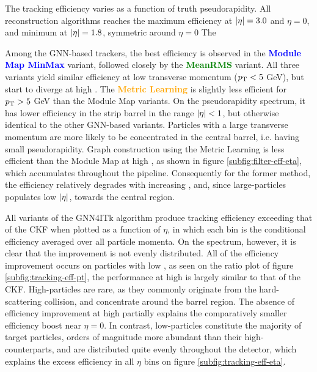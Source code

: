 The tracking efficiency varies as a function of truth pseudorapidity.
All reconstruction algorithms reaches the maximum efficiency at $\abs{\eta}=3.0$ and $\eta=0$, and minimum at $\abs{\eta}=1.8$, symmetric around $\eta=0$
The 

Among the GNN-based trackers, the best efficiency is observed in the \textcolor{blue}{\textbf{Module Map MinMax}} variant, followed closely by the \textcolor{green}{\textbf{MeanRMS}} variant.
All three variants yield similar efficiency at low transverse momentum ($p_{\text{T}}<5$ GeV), but start to diverge at high \pT.
The \textcolor{orange}{\textbf{Metric Learning}} is slightly less efficient for $p_{\text{T}} > 5$ GeV than the Module Map variants.
On the pseudorapidity spectrum, it has lower efficiency in the strip barrel in the range $\abs{\eta}<1$, but otherwise identical to the other GNN-based variants.
Particles with a large transverse momentum are more likely to be concentrated in the central barrel, i.e. having small pseudorapidity. 
Graph construction using the Metric Learning is less efficient than the Module Map at high \pT, as shown in figure \ref{subfig:filter-eff-eta}, which accumulates throughout the pipeline. 
Consequently for the former method, the efficiency relatively degrades with increasing \pT, and, since large-\pT particles populates low $\abs{\eta}$, towards the central region.

All variants of the GNN4ITk algorithm produce tracking efficiency exceeding that of the CKF when plotted as a function of $\eta$, in which each bin is the conditional efficiency averaged over all particle momenta. 
On the \pT spectrum, however, it is clear that the improvement is not evenly distributed. 
All of the efficiency improvement occurs on particles with low \pT, as seen on the ratio plot of figure \ref{subfig:tracking-eff-pt}, the performance at high \pT is largely similar to that of the CKF.
High-\pT particles are rare, as they commonly originate from the hard-scattering collision, and concentrate around the barrel region.
The absence of efficiency improvement at high \pT partially explains the comparatively smaller efficiency boost near $\eta=0$. 
In contrast, low-\pT particles constitute the majority of target particles, orders of magnitude more abundant than their high-\pT counterparts, and are distributed quite evenly throughout the detector, which explains the excess efficiency in all $\eta$ bins on figure \ref{subfig:tracking-eff-eta}. 

